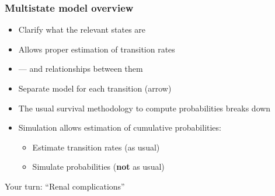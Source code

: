\begin{frame}
   \frametitle{Multistate model overview}
\pause
   \begin{itemize}[<+->]
   \item Clarify what the relevant states are
   \item Allows proper estimation of transition rates
   \item --- and relationships between them
   \item Separate model for each transition (arrow)
   \item The usual survival methodology to compute probabilities breaks down
   \item Simulation allows estimation of cumulative probabilities:

     \begin{itemize}[<+->]
     \item Estimate transition rates (as usual)
     \item Simulate probabilities (\textbf{not} as usual)
     \end{itemize}

   \end{itemize}
\pause
Your turn: ``Renal complications''
\end{frame}


